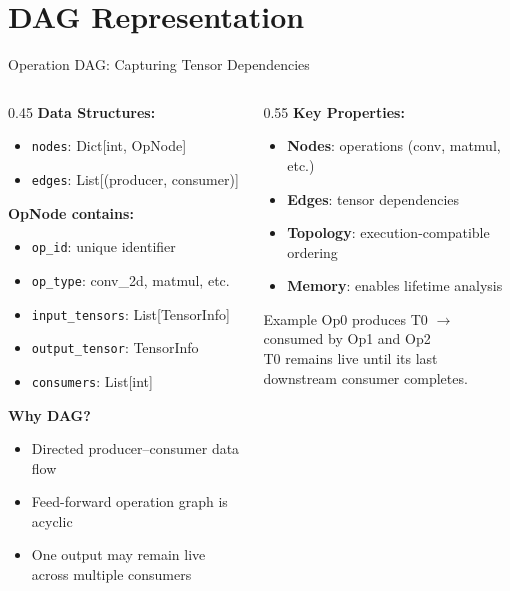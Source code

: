 \documentclass[10pt,aspectratio=169]{beamer}
\begin{document}
\section{DAG Representation}
\begin{frame}{Operation DAG: Capturing Tensor Dependencies}
\begin{columns}
\begin{column}{0.45\textwidth}
\textbf{Data Structures:}
\begin{itemize}
\small
\item \texttt{nodes}: Dict[int, OpNode]
\item \texttt{edges}: List[(producer, consumer)]
\end{itemize}

\vspace{0.25cm}
\textbf{OpNode contains:}
\begin{itemize}
\small
\item \texttt{op\_id}: unique identifier
\item \texttt{op\_type}: conv\_2d, matmul, etc.
\item \texttt{input\_tensors}: List[TensorInfo]
\item \texttt{output\_tensor}: TensorInfo
\item \texttt{consumers}: List[int]
\end{itemize}

\vspace{0.25cm}
\textbf{Why DAG?}
\begin{itemize}
\small
\item Directed producer--consumer data flow
\item Feed-forward operation graph is acyclic
\item One output may remain live across multiple consumers
\end{itemize}
\end{column}

\begin{column}{0.55\textwidth}
\centering
\textbf{Key Properties:}
\vspace{0.4cm}
\begin{itemize}
\item \textbf{Nodes}: operations (conv, matmul, etc.)
\item \textbf{Edges}: tensor dependencies
\item \textbf{Topology}: execution-compatible ordering
\item \textbf{Memory}: enables lifetime analysis
\end{itemize}

\vspace{0.4cm}
\begin{block}{Example}
\small
Op0 produces T0 $\to$ consumed by Op1 and Op2\\
T0 remains live until its last downstream consumer completes.
\end{block}
\end{column}
\end{columns}
\end{frame}
\end{document}
